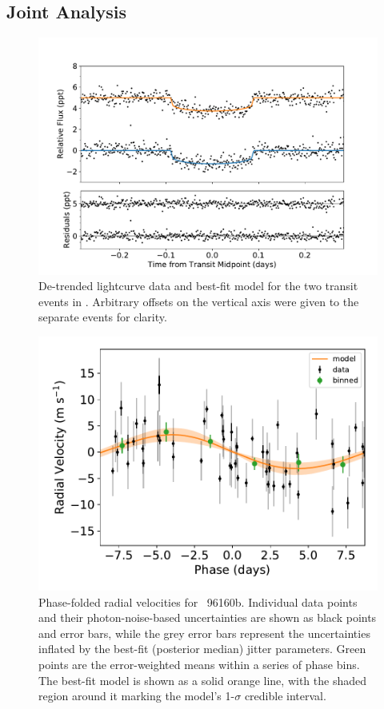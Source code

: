 \documentclass[modern]{aastex62}
\newcommand{\plname}{\acronym{HIP}\ 96160b\xspace}
\begin{document}
\subsection{Joint Analysis}
\label{s:analysis:joint}

\begin{figure}
    \centering
    \includegraphics[width=\textwidth]{transits.pdf}
    \caption{De-trended lightcurve data and best-fit model for the two transit events in \TESS. Arbitrary offsets on the vertical axis were given to the separate events for clarity.}
    \label{fig:transits}
\end{figure}

\begin{figure}
    \centering
    \includegraphics[width=16cm]{rvphased_1pl_wfwhm}
    \caption{Phase-folded radial velocities for \plname. Individual data points and their photon-noise-based uncertainties are shown as black points and error bars, while the grey error bars represent the uncertainties inflated by the best-fit (posterior median) jitter parameters. Green points are the error-weighted means within a series of phase bins. The best-fit model is shown as a solid orange line, with the shaded region around it marking the model's 1-$\sigma$ credible interval.}
    \label{fig:rv_phased}
\end{figure}
\end{document}
